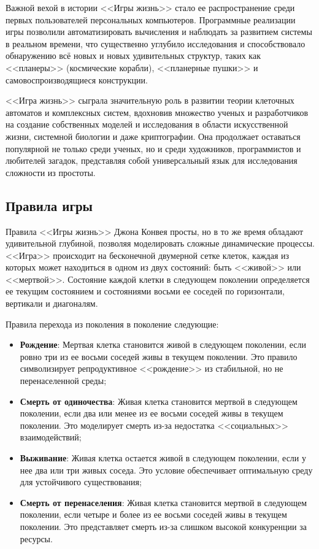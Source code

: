 Важной вехой в истории <<Игры жизнь>> стало ее распространение среди первых пользователей персональных компьютеров. Программные реализации игры позволили автоматизировать вычисления и наблюдать за развитием системы в реальном времени, что существенно углубило исследования и способствовало обнаружению всё новых и новых удивительных структур, таких как <<планеры>> (космические корабли), <<планерные пушки>> и самовоспроизводящиеся конструкции.

<<Игра жизнь>> сыграла значительную роль в развитии теории клеточных автоматов и комплексных систем, вдохновив множество ученых и разработчиков на создание собственных моделей и исследования в области искусственной жизни, системной биологии и даже криптографии. Она продолжает оставаться популярной не только среди ученых, но и среди художников, программистов и любителей загадок, представляя собой универсальный язык для исследования сложности из простоты.

\subsection{\label{subsec:ch01/sec04/subsec02}Правила игры}
Правила <<Игры жизнь>> Джона Конвея просты, но в то же время обладают удивительной глубиной, позволяя моделировать сложные динамические процессы. <<Игра>> происходит на бесконечной двумерной сетке клеток, каждая из которых может находиться в одном из двух состояний: быть <<живой>> или <<мертвой>>. Состояние каждой клетки в следующем поколении определяется ее текущим состоянием и состояниями восьми ее соседей по горизонтали, вертикали и диагоналям.

Правила перехода из поколения в поколение следующие:
	\begin{itemize}
		\item \textbf{Рождение}: Мертвая клетка становится живой в следующем поколении, если ровно три из ее восьми соседей живы в текущем поколении. Это правило символизирует репродуктивное <<рождение>> из стабильной, но не перенаселенной среды;
		\item \textbf{Смерть от одиночества}: Живая клетка становится мертвой в следующем поколении, если два или менее из ее восьми соседей живы в текущем поколении. Это моделирует смерть из-за недостатка <<социальных>> взаимодействий;
		\item \textbf{Выживание}: Живая клетка остается живой в следующем поколении, если у нее два или три живых соседа. Это условие обеспечивает оптимальную среду для устойчивого существования;
		\item \textbf{Смерть от перенаселения}: Живая клетка становится мертвой в следующем поколении, если четыре и более из ее восьми соседей живы в текущем поколении. Это представляет смерть из-за слишком высокой конкуренции за ресурсы.
	\end{itemize}

